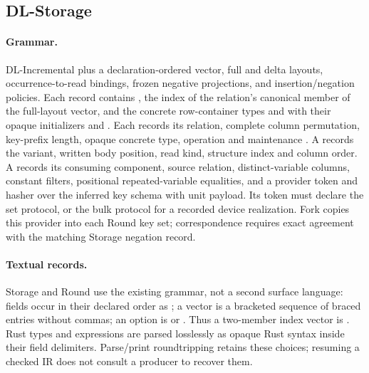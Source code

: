 \subsection{DL-Storage}
\paragraph{Grammar.} DL-Incremental plus a declaration-ordered
 vector, full and delta layouts, occurrence-to-read bindings,
frozen negative projections, and insertion/negation policies. Each
 record contains , the index of the relation's
canonical member of the full-layout vector, and the concrete row-container
types  and  with their opaque initializers
 and . Each 
records its relation, complete column permutation, key-prefix length,
opaque concrete  type,  operation and
maintenance .
A  records the variant, written body position, read kind, structure
index and column order. A  records its consuming component,
source relation, distinct-variable columns, constant filters, positional
repeated-variable equalities, and a provider token and hasher over the inferred
key schema \code{\_} with unit payload. Its token must declare the set protocol,
or the bulk protocol for a recorded device realization.
Fork copies this provider into each Round key set; correspondence requires exact
agreement with the matching Storage negation record.

\paragraph{Textual records.} Storage and Round use the existing
 grammar, not a second surface language: fields occur in their
declared order as ; a vector is a bracketed sequence
of braced entries without commas; an option is \code{[]} or
\code{[payload]}. Thus a two-member index vector is \code{[\{0\}\{1\}]}.
Rust types and expressions are parsed losslessly as opaque Rust syntax inside
their field delimiters. Parse/print roundtripping retains these choices;
resuming a checked IR does not consult a producer to recover them.


